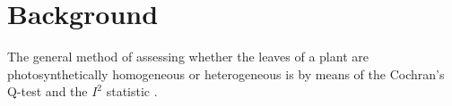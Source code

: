 \documentclass{bioinfo}
\begin{document}
\section{Background}
The general method of assessing whether the leaves of a plant are photosynthetically homogeneous or heterogeneous is by means of the Cochran's Q-test \citep{conover1999Practical} and the $I^2$ statistic \citep{higgins2002quantifying,higgins2003measuring}. %
%
%
%








\end{document}

